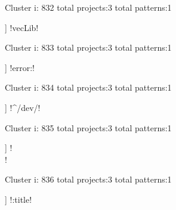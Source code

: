 Cluster i: 832
total projects:3
total patterns:1
\begin{multicols}{1}
\begin{description}[noitemsep,topsep=0pt]
\item [[3] ] \cverb!vecLib!
\end{description}
\end{multicols}







Cluster i: 833
total projects:3
total patterns:1
\begin{multicols}{1}
\begin{description}[noitemsep,topsep=0pt]
\item [[3] ] \cverb!error:!
\end{description}
\end{multicols}







Cluster i: 834
total projects:3
total patterns:1
\begin{multicols}{1}
\begin{description}[noitemsep,topsep=0pt]
\item [[3] ] \cverb!^/dev/!
\end{description}
\end{multicols}







Cluster i: 835
total projects:3
total patterns:1
\begin{multicols}{1}
\begin{description}[noitemsep,topsep=0pt]
\item [[3] ] \cverb!\[\]!
\end{description}
\end{multicols}







Cluster i: 836
total projects:3
total patterns:1
\begin{multicols}{1}
\begin{description}[noitemsep,topsep=0pt]
\item [[3] ] \cverb!:title!
\end{description}
\end{multicols}







